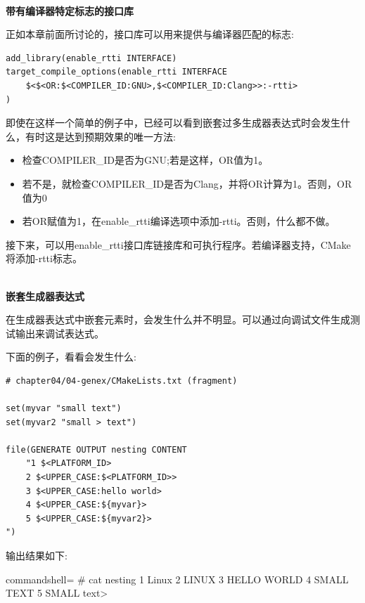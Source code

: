 \hspace*{\fill} \\ %
\noindent
\textbf{带有编译器特定标志的接口库}

正如本章前面所讨论的，接口库可以用来提供与编译器匹配的标志:

\begin{lstlisting}[style=styleCMake]
add_library(enable_rtti INTERFACE)
target_compile_options(enable_rtti INTERFACE
	$<$<OR:$<COMPILER_ID:GNU>,$<COMPILER_ID:Clang>>:-rtti>
)
\end{lstlisting}

即使在这样一个简单的例子中，已经可以看到嵌套过多生成器表达式时会发生什么，有时这是达到预期效果的唯一方法:

\begin{itemize}
\item 
检查COMPILER\_ID是否为GNU;若是这样，OR值为1。

\item 
若不是，就检查COMPILER\_ID是否为Clang，并将OR计算为1。否则，OR值为0

\item 
若OR赋值为1，在enable\_rtti编译选项中添加-rtti。否则，什么都不做。
\end{itemize}

接下来，可以用enable\_rtti接口库链接库和可执行程序。若编译器支持，CMake将添加-rtti标志。

\hspace*{\fill} \\ %
\noindent
\textbf{嵌套生成器表达式}

在生成器表达式中嵌套元素时，会发生什么并不明显。可以通过向调试文件生成测试输出来调试表达式。

下面的例子，看看会发生什么:

\begin{lstlisting}[style=styleCMake]
# chapter04/04-genex/CMakeLists.txt (fragment)

set(myvar "small text")
set(myvar2 "small > text")

file(GENERATE OUTPUT nesting CONTENT
	"1 $<PLATFORM_ID>
	2 $<UPPER_CASE:$<PLATFORM_ID>>
	3 $<UPPER_CASE:hello world>
	4 $<UPPER_CASE:${myvar}>
	5 $<UPPER_CASE:${myvar2}>
")
\end{lstlisting}

输出结果如下:

\begin{tcblisting}{commandshell={}}
# cat nesting
1 Linux
  2 LINUX
  3 HELLO WORLD
  4 SMALL TEXT
  5 SMALL text>
\end{tcblisting}

